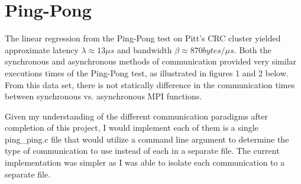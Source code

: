 \documentclass[12pt, letterpaper]{report}
\begin{document}
\section{Ping-Pong}

The linear regression from the Ping-Pong test on Pitt's CRC cluster yielded approximate latency $\lambda\approx13 \mu s$ and bandwidth $\beta\approx870 bytes/\mu s$. Both the synchronous and asynchronous methods of communication provided very similar executions times of the Ping-Pong test, as illustrated in figures 1 and 2 below. From this data set, there is not statically difference in the communication times between synchronous vs. asynchronous MPI functions.

\begin{figure}[H]
	\captionsetup[subfigure]{labelformat=empty}
	\centering
	\qquad
	\label{fig:example}
\end{figure}

Given my understanding of the different communication paradigms after completion of this project, I would implement each of them is a single ping\_ping.c file that would utilize a command line argument to determine the type of communication to use instead of each in a separate file. The current implementation was simpler as I was able to isolate each communication to a separate file.
\end{document}
